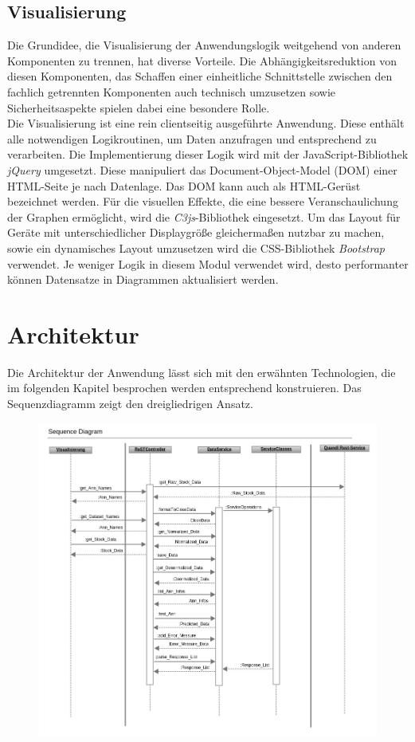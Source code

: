 \subsection{Visualisierung}
Die Grundidee, die Visualisierung der Anwendungslogik weitgehend von anderen Komponenten zu trennen, hat diverse Vorteile. Die Abhängigkeitsreduktion von diesen Komponenten, das Schaffen einer einheitliche Schnittstelle zwischen den fachlich getrennten Komponenten auch technisch umzusetzen sowie Sicherheitsaspekte spielen dabei eine besondere Rolle.\\
Die Visualisierung ist eine rein clientseitig ausgeführte Anwendung. Diese enthält alle notwendigen Logikroutinen, um Daten anzufragen und entsprechend zu verarbeiten. Die Implementierung dieser Logik wird mit der JavaScript-Bibliothek \emph{jQuery} umgesetzt. Diese manipuliert das Document-Object-Model (DOM) einer HTML-Seite je nach Datenlage. Das DOM kann auch als HTML-Gerüst bezeichnet werden. Für die visuellen Effekte, die eine bessere Veranschaulichung der Graphen ermöglicht, wird die \emph{C3js}-Bibliothek eingesetzt. Um das Layout für Geräte mit unterschiedlicher Displaygröße gleichermaßen nutzbar zu machen, sowie ein dynamisches Layout umzusetzen wird die CSS-Bibliothek \emph{Bootstrap} verwendet. Je weniger Logik in diesem Modul verwendet wird, desto performanter können Datensatze in Diagrammen aktualisiert werden. 

\section{Architektur}
Die Architektur der Anwendung lässt sich mit den erwähnten Technologien, die im folgenden Kapitel besprochen werden entsprechend konstruieren. Das Sequenzdiagramm zeigt den dreigliedrigen Ansatz. 

\begin{figure}[H]
\includegraphics[width=15cm]{Bilder/Konzeption/sequence_dia_rest_env.png}
\end{figure}

